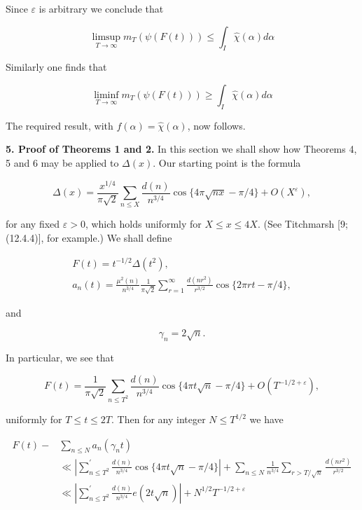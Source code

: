 \documentclass[10pt]{article}
\newcommand{\articleSection}[2]{%
  \par\medskip\noindent\textbf{#1. #2.}\enspace
}
\begin{document}
Since $\varepsilon$ is arbitrary we conclude that

$$
\limsup _{T \rightarrow \infty} m_{T}(\psi(F(t))) \leq \int_{I} \widehat{\chi}(\alpha) d \alpha
$$

Similarly one finds that

$$
\liminf _{T \rightarrow \infty} m_{T}(\psi(F(t))) \geq \int_{I} \widehat{\chi}(\alpha) d \alpha
$$

The required result, with $f(\alpha)=\widehat{\chi}(\alpha)$, now follows.

\articleSection{5}{Proof of Theorems 1 and 2}In this section we shall show how Theorems 4, 5 and 6 may be applied to $\Delta(x)$. Our starting point is the formula


\begin{equation*}
\Delta(x)=\frac{x^{1 / 4}}{\pi \sqrt{2}} \sum_{n \leq X} \frac{d(n)}{n^{3 / 4}} \cos \{4 \pi \sqrt{n x}-\pi / 4\}+O\left(X^{\varepsilon}\right), \tag{5.1}
\end{equation*}


for any fixed $\varepsilon>0$, which holds uniformly for $X \leq x \leq 4 X$. (See Titchmarsh [9; (12.4.4)], for example.) We shall define

$$
\begin{gathered}
F(t)=t^{-1 / 2} \Delta\left(t^{2}\right), \\
a_{n}(t)=\frac{\mu^{2}(n)}{n^{3 / 4}} \frac{1}{\pi \sqrt{2}} \sum_{r=1}^{\infty} \frac{d\left(n r^{2}\right)}{r^{3 / 2}} \cos \{2 \pi r t-\pi / 4\},
\end{gathered}
$$

and

$$
\gamma_{n}=2 \sqrt{n} .
$$

In particular, we see that

$$
F(t)=\frac{1}{\pi \sqrt{2}} \sum_{n \leq T^{2}} \frac{d(n)}{n^{3 / 4}} \cos \{4 \pi t \sqrt{n}-\pi / 4\}+O\left(T^{-1 / 2+\varepsilon}\right),
$$

uniformly for $T \leq t \leq 2 T$. Then for any integer $N \leq T^{1 / 2}$ we have

$$
\begin{aligned}
F(t)- & \sum_{n \leq N} a_{n}\left(\gamma_{n} t\right) \\
& \ll\left|\sum_{n \leq T^{2}}^{\prime} \frac{d(n)}{n^{3 / 4}} \cos \{4 \pi t \sqrt{n}-\pi / 4\}\right|+\sum_{n \leq N} \frac{1}{n^{3 / 4}} \sum_{r>T / \sqrt{n}} \frac{d\left(n r^{2}\right)}{r^{3 / 2}} \\
& \ll\left|\sum_{n \leq T^{2}}^{\prime} \frac{d(n)}{n^{3 / 4}} e(2 t \sqrt{n})\right|+N^{1 / 2} T^{-1 / 2+\varepsilon}
\end{aligned}
$$
\end{document}
